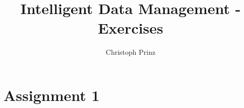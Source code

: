 \documentclass[]{scrartcl}
\title{Intelligent Data Management - Exercises}
\author{Christoph Prinz}
\begin{document}
\maketitle


\section{Assignment 1}
\end{document}
